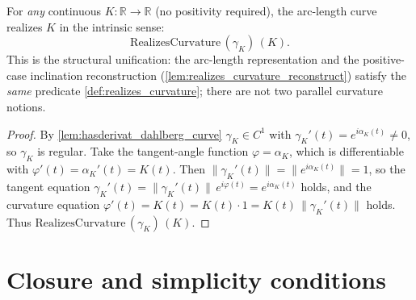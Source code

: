 \begin{lemma}


  \label{lem:realizes_curvature_dahlberg}
  For \emph{any} continuous $K : \mathbb{R}\to\mathbb{R}$ (no positivity required),
  the arc-length curve realizes $K$ in the intrinsic sense:
  \[
    \mathrm{RealizesCurvature}\,(\gamma_K)\,(K).
  \]
  This is the structural unification: the arc-length representation and the
  positive-case inclination reconstruction (\cref{lem:realizes_curvature_reconstruct})
  satisfy the \emph{same} predicate \cref{def:realizes_curvature}; there are not
  two parallel curvature notions.
\end{lemma}
\begin{proof}
  \leanok
  By \cref{lem:hasderivat_dahlberg_curve} $\gamma_K\in C^1$ with
  $\gamma_K'(t)=e^{i\alpha_K(t)}\neq 0$, so $\gamma_K$ is regular. Take the
  tangent-angle function $\varphi=\alpha_K$, which is differentiable with
  $\varphi'(t)=\alpha_K'(t)=K(t)$. Then $\lVert\gamma_K'(t)\rVert=
  \lVert e^{i\alpha_K(t)}\rVert=1$, so the tangent equation
  $\gamma_K'(t)=\lVert\gamma_K'(t)\rVert\,e^{i\varphi(t)}=e^{i\alpha_K(t)}$ holds,
  and the curvature equation $\varphi'(t)=K(t)=K(t)\cdot 1=K(t)\,
  \lVert\gamma_K'(t)\rVert$ holds. Thus $\mathrm{RealizesCurvature}\,(\gamma_K)\,(K)$.
\end{proof}

\section{Closure and simplicity conditions}

